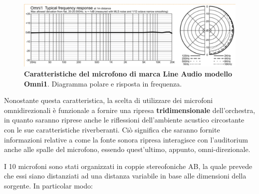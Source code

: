 	\begin{figure}[h]
		\begin{center}
			\includegraphics[width=.47\textwidth]{img/image1.png}
			\caption{\textbf{Caratteristiche del microfono di marca Line Audio modello Omni1}. Diagramma polare e risposta in frequenza.}
			\label{gr01}
		\end{center}
	\end{figure}
	
	Nonostante questa caratteristica, la scelta di utilizzare dei microfoni omnidirezionali è funzionale a fornire una ripresa \textbf{tridimensionale} dell'orchestra, in quanto saranno riprese anche le riflessioni dell'ambiente acustico circostante con le sue caratteristiche riverberanti. Ciò significa che saranno fornite informazioni relative a come la fonte sonora ripresa interagisce con l'auditorium anche alle spalle del microfono, essendo quest'ultimo, appunto, omni-direzionale.
	
	I 10 microfoni sono stati organizzati in coppie stereofoniche AB, la quale prevede che essi siano distanziati ad una distanza variabile in base alle dimensioni della sorgente. In particolar modo:
	
